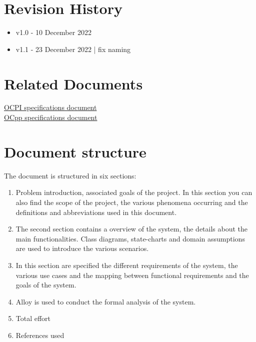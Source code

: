 \documentclass[12pt]{article}
\begin{document}
\section{Revision History}
\begin{itemize}
	\item v1.0 - 10 December 2022
	\item v1.1 - 23 December 2022 | fix naming 
\end{itemize}

\section{Related Documents}
\href{../Specs/OCPI-2.2.1.pdf}{OCPI specifications document}\\
\href{../Specs/ocpp-1.6.pdf.pdf}{OCpp specifications document}

\section{Document structure}
The document is structured in six sections:

\begin{enumerate}
	\item Problem introduction, associated goals of the project. In this section you can also find the scope of the project, the various phenomena occurring and the definitions and abbreviations used in this document.
	\item The second section contains a overview of the system, the details about the main functionalities. Class diagrams, state-charts and domain assumptions are used to introduce the various scenarios.
	\item In this section are specified the different requirements of the system, the various use cases and the mapping between functional requirements and the goals of the system.
	\item Alloy is used to conduct the formal analysis of the system.
	\item Total effort
	\item References used
\end{enumerate}
\end{document}
